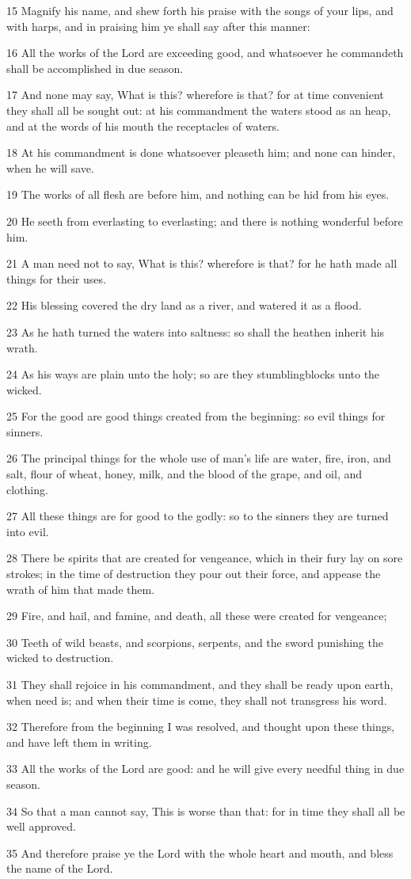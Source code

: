\par 15 Magnify his name, and shew forth his praise with the songs of your lips, and with harps, and in praising him ye shall say after this manner:
\par 16 All the works of the Lord are exceeding good, and whatsoever he commandeth shall be accomplished in due season.
\par 17 And none may say, What is this? wherefore is that? for at time convenient they shall all be sought out: at his commandment the waters stood as an heap, and at the words of his mouth the receptacles of waters.
\par 18 At his commandment is done whatsoever pleaseth him; and none can hinder, when he will save.
\par 19 The works of all flesh are before him, and nothing can be hid from his eyes.
\par 20 He seeth from everlasting to everlasting; and there is nothing wonderful before him.
\par 21 A man need not to say, What is this? wherefore is that? for he hath made all things for their uses.
\par 22 His blessing covered the dry land as a river, and watered it as a flood.
\par 23 As he hath turned the waters into saltness: so shall the heathen inherit his wrath.
\par 24 As his ways are plain unto the holy; so are they stumblingblocks unto the wicked.
\par 25 For the good are good things created from the beginning: so evil things for sinners.
\par 26 The principal things for the whole use of man's life are water, fire, iron, and salt, flour of wheat, honey, milk, and the blood of the grape, and oil, and clothing.
\par 27 All these things are for good to the godly: so to the sinners they are turned into evil.
\par 28 There be spirits that are created for vengeance, which in their fury lay on sore strokes; in the time of destruction they pour out their force, and appease the wrath of him that made them.
\par 29 Fire, and hail, and famine, and death, all these were created for vengeance;
\par 30 Teeth of wild beasts, and scorpions, serpents, and the sword punishing the wicked to destruction.
\par 31 They shall rejoice in his commandment, and they shall be ready upon earth, when need is; and when their time is come, they shall not transgress his word.
\par 32 Therefore from the beginning I was resolved, and thought upon these things, and have left them in writing.
\par 33 All the works of the Lord are good: and he will give every needful thing in due season.
\par 34 So that a man cannot say, This is worse than that: for in time they shall all be well approved.
\par 35 And therefore praise ye the Lord with the whole heart and mouth, and bless the name of the Lord.

